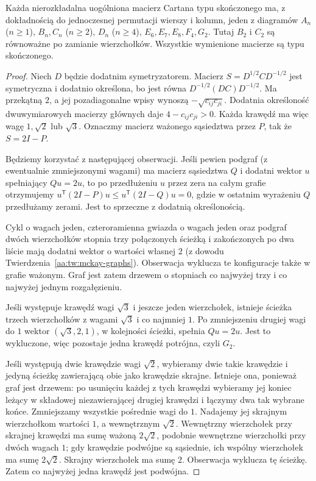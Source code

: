 \begin{twierdzenie}
\label{aa:tw:finite-dynkin}
Każda nierozkładalna uogólniona macierz Cartana typu
skończonego ma, z dokładnością do jednoczesnej
permutacji wierszy i kolumn, jeden z diagramów
$A_n$ ($n\ge1$), $B_n,C_n$ ($n\ge2$),
$D_n$ ($n\ge4$), $E_6,E_7,E_8,F_4,G_2$.
Tutaj $B_2$ i $C_2$ są równoważne po zamianie wierzchołków.
Wszystkie wymienione macierze są typu skończonego.
\end{twierdzenie}
\begin{proof}
Niech $D$ będzie dodatnim symetryzatorem.
Macierz $S=D^{1/2}CD^{-1/2}$ jest symetryczna
i dodatnio określona, bo jest równa
$D^{-1/2}(DC)D^{-1/2}$. Ma przekątną $2$,
a jej pozadiagonalne wpisy wynoszą
$-\sqrt{c_{ij}c_{ji}}$. Dodatnia określoność
dwuwymiarowych macierzy głównych daje
$4-c_{ij}c_{ji}>0$. Każda krawędź ma więc
wagę $1,\sqrt2$ lub $\sqrt3$.
Oznaczmy macierz ważonego sąsiedztwa przez $P$,
tak że $S=2I-P$.

Będziemy korzystać z następującej obserwacji.
Jeśli pewien podgraf (z ewentualnie zmniejszonymi
wagami) ma macierz sąsiedztwa $Q$ i dodatni wektor
$u$ spełniający $Qu=2u$, to po przedłużeniu $u$
przez zera na całym grafie otrzymujemy
$u^{\mathsf T}(2I-P)u\le u^{\mathsf T}(2I-Q)u=0$,
gdzie w ostatnim wyrażeniu $Q$ przedłużamy zerami.
Jest to sprzeczne z dodatnią określonością.

Cykl o wagach jeden, czteroramienna gwiazda o wagach
jeden oraz podgraf dwóch wierzchołków stopnia trzy
połączonych ścieżką i zakończonych po dwa liście
mają dodatni wektor o wartości własnej $2$
(z dowodu Twierdzenia~\ref{aa:tw:mckay-graphs}).
Obserwacja wyklucza te konfiguracje także w grafie
ważonym. Graf jest zatem drzewem o stopniach co
najwyżej trzy i co najwyżej jednym rozgałęzieniu.

Jeśli występuje krawędź wagi $\sqrt3$ i jeszcze
jeden wierzchołek, istnieje ścieżka trzech
wierzchołków z wagami $\sqrt3$ i co najmniej $1$.
Po zmniejszeniu drugiej wagi do $1$ wektor
$(\sqrt3,2,1)$, w kolejności ścieżki, spełnia
$Qu=2u$. Jest to wykluczone, więc pozostaje
jedna krawędź potrójna, czyli $G_2$.

Jeśli występują dwie krawędzie wagi $\sqrt2$,
wybieramy dwie takie krawędzie i jedyną ścieżkę
zawierającą obie jako krawędzie skrajne. Istnieje
ona, ponieważ graf jest drzewem: po usunięciu
każdej z tych krawędzi wybieramy jej koniec leżący
w składowej niezawierającej drugiej krawędzi
i łączymy dwa tak wybrane końce.
Zmniejszamy wszystkie pośrednie wagi do $1$.
Nadajemy jej skrajnym wierzchołkom wartości $1$,
a wewnętrznym $\sqrt2$. Wewnętrzny wierzchołek
przy skrajnej krawędzi ma sumę ważoną $2\sqrt2$,
podobnie wewnętrzne wierzchołki przy dwóch wagach
$1$; gdy krawędzie podwójne są sąsiednie, ich wspólny
wierzchołek ma sumę $2\sqrt2$. Skrajny wierzchołek
ma sumę $2$. Obserwacja wyklucza tę ścieżkę.
Zatem co najwyżej jedna krawędź jest podwójna.


\end{proof}
